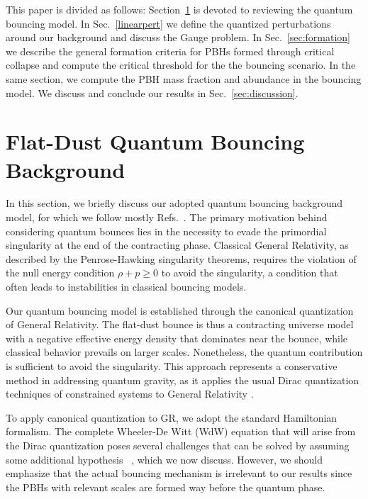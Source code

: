 \documentclass[a4paper,11pt]{article}
\begin{document}
This paper is divided as follows: Section~\ref{sec:bounce} is devoted to reviewing the
quantum bouncing model. In Sec.~\ref{linearpert} we define the quantized perturbations
around our background and discuss the Gauge problem. In Sec.~\ref{sec:formation} we
describe the general formation criteria for PBHs formed through critical collapse and
compute the critical threshold for the the bouncing scenario. In the same section, we
compute the PBH mass fraction and abundance in the bouncing model. We discuss and
conclude our results in Sec.~\ref{sec:discussion}.


\section{Flat-Dust Quantum Bouncing Background}
\label{sec:bounce}

In this section, we briefly discuss our adopted quantum bouncing background model, for
which we follow mostly Refs.~\cite{nelson_peter_bouncing_original, fluidgeral,
	nelson2021bouncing}. The primary motivation behind considering quantum bounces lies in
the necessity to evade the primordial singularity at the end of the contracting phase.
Classical General Relativity, as described by the Penrose-Hawking singularity theorems,
requires the violation of the null energy condition $\rho + p \geq 0$ to avoid the
singularity, a condition that often leads to instabilities in classical bouncing models.

Our quantum bouncing model is established through the canonical quantization of General
Relativity. The flat-dust bounce is thus a contracting universe model with a negative
effective energy density that dominates near the bounce, while classical behavior
prevails on larger scales. Nonetheless, the quantum contribution is sufficient to avoid
the singularity. This approach represents a conservative method in addressing quantum
gravity, as it applies the usual Dirac quantization techniques of constrained systems to
General Relativity \cite{nelsonhamiltonian}.

To apply canonical quantization to GR, we adopt the standard Hamiltonian formalism.  The
complete Wheeler-De Witt (WdW) equation that will arise from the Dirac quantization
poses several challenges that can be solved by assuming some additional hypothesis
~\cite{nelson2000bohm,halliwell1990introductory,nelson2021bouncing,nelson_bohm2023},
which we now discuss.  However, we should emphasize that the actual bouncing mechanism
is irrelevant to our results since the PBHs with relevant scales are formed way before
the quantum phase.
\end{document}
